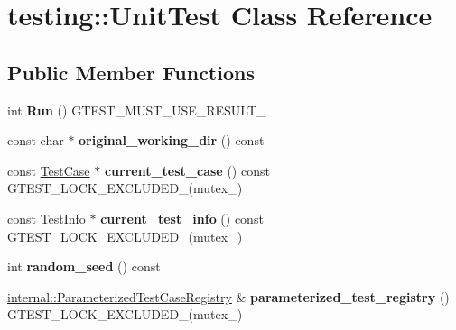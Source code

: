 \hypertarget{classtesting_1_1_unit_test}{}\section{testing\+:\+:Unit\+Test Class Reference}
\label{classtesting_1_1_unit_test}
\subsection*{Public Member Functions}
\begin{DoxyCompactItemize}
\item 
\mbox{\label{classtesting_1_1_unit_test_a2febc800536b44500565f4c423f359d3}} 
int {\bfseries Run} () G\+T\+E\+S\+T\+\_\+\+M\+U\+S\+T\+\_\+\+U\+S\+E\+\_\+\+R\+E\+S\+U\+L\+T\+\_\+
\item 
\mbox{\label{classtesting_1_1_unit_test_af6809b7747785c80f7a2f31f6b39b152}} 
const char $\ast$ {\bfseries original\+\_\+working\+\_\+dir} () const
\item 
\mbox{\label{classtesting_1_1_unit_test_a2bf61896036ae03edbd7bceed14f9e18}} 
const \mbox{\hyperlink{classtesting_1_1_test_case}{Test\+Case}} $\ast$ {\bfseries current\+\_\+test\+\_\+case} () const G\+T\+E\+S\+T\+\_\+\+L\+O\+C\+K\+\_\+\+E\+X\+C\+L\+U\+D\+E\+D\+\_\+(mutex\+\_\+)
\item 
\mbox{\label{classtesting_1_1_unit_test_a088eaf814a33085ace3d881d22e6bdea}} 
const \mbox{\hyperlink{classtesting_1_1_test_info}{Test\+Info}} $\ast$ {\bfseries current\+\_\+test\+\_\+info} () const G\+T\+E\+S\+T\+\_\+\+L\+O\+C\+K\+\_\+\+E\+X\+C\+L\+U\+D\+E\+D\+\_\+(mutex\+\_\+)
\item 
\mbox{\label{classtesting_1_1_unit_test_adddc090a06f2d3a0e68f3762ee262688}} 
int {\bfseries random\+\_\+seed} () const
\item 
\mbox{\label{classtesting_1_1_unit_test_a8f9c5d0d9f1b6d23c94070944a43c550}} 
\mbox{\hyperlink{classtesting_1_1internal_1_1_parameterized_test_case_registry}{internal\+::\+Parameterized\+Test\+Case\+Registry}} \& {\bfseries parameterized\+\_\+test\+\_\+registry} () G\+T\+E\+S\+T\+\_\+\+L\+O\+C\+K\+\_\+\+E\+X\+C\+L\+U\+D\+E\+D\+\_\+(mutex\+\_\+)

\end{DoxyCompactItemize}
